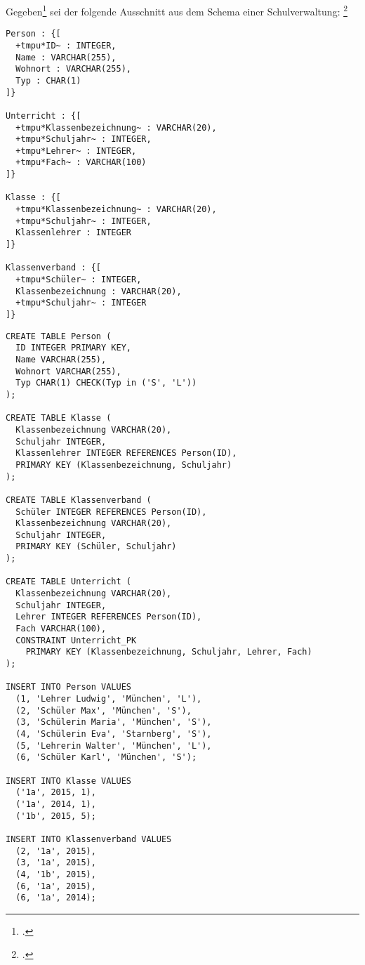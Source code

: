 \documentclass{bschlangaul-aufgabe}
\begin{document}

Gegeben\footcite{examen:66116:2016:09} sei der folgende Ausschnitt aus
dem Schema einer Schulverwaltung:
\footcite[2. SQL und relationale Algebra]{db:ab:examen-gym-2016-09}

\newcommand{\tmpu}[1]{\underline{\texttt{#1}}}

\begin{Verbatim}[commandchars=+*~]
Person : {[
  +tmpu*ID~ : INTEGER,
  Name : VARCHAR(255),
  Wohnort : VARCHAR(255),
  Typ : CHAR(1)
]}

Unterricht : {[
  +tmpu*Klassenbezeichnung~ : VARCHAR(20),
  +tmpu*Schuljahr~ : INTEGER,
  +tmpu*Lehrer~ : INTEGER,
  +tmpu*Fach~ : VARCHAR(100)
]}

Klasse : {[
  +tmpu*Klassenbezeichnung~ : VARCHAR(20),
  +tmpu*Schuljahr~ : INTEGER,
  Klassenlehrer : INTEGER
]}

Klassenverband : {[
  +tmpu*Schüler~ : INTEGER,
  Klassenbezeichnung : VARCHAR(20),
  +tmpu*Schuljahr~ : INTEGER
]}
\end{Verbatim}

\begin{verbatim}
CREATE TABLE Person (
  ID INTEGER PRIMARY KEY,
  Name VARCHAR(255),
  Wohnort VARCHAR(255),
  Typ CHAR(1) CHECK(Typ in ('S', 'L'))
);

CREATE TABLE Klasse (
  Klassenbezeichnung VARCHAR(20),
  Schuljahr INTEGER,
  Klassenlehrer INTEGER REFERENCES Person(ID),
  PRIMARY KEY (Klassenbezeichnung, Schuljahr)
);

CREATE TABLE Klassenverband (
  Schüler INTEGER REFERENCES Person(ID),
  Klassenbezeichnung VARCHAR(20),
  Schuljahr INTEGER,
  PRIMARY KEY (Schüler, Schuljahr)
);

CREATE TABLE Unterricht (
  Klassenbezeichnung VARCHAR(20),
  Schuljahr INTEGER,
  Lehrer INTEGER REFERENCES Person(ID),
  Fach VARCHAR(100),
  CONSTRAINT Unterricht_PK
    PRIMARY KEY (Klassenbezeichnung, Schuljahr, Lehrer, Fach)
);

INSERT INTO Person VALUES
  (1, 'Lehrer Ludwig', 'München', 'L'),
  (2, 'Schüler Max', 'München', 'S'),
  (3, 'Schülerin Maria', 'München', 'S'),
  (4, 'Schülerin Eva', 'Starnberg', 'S'),
  (5, 'Lehrerin Walter', 'München', 'L'),
  (6, 'Schüler Karl', 'München', 'S');

INSERT INTO Klasse VALUES
  ('1a', 2015, 1),
  ('1a', 2014, 1),
  ('1b', 2015, 5);

INSERT INTO Klassenverband VALUES
  (2, '1a', 2015),
  (3, '1a', 2015),
  (4, '1b', 2015),
  (6, '1a', 2015),
  (6, '1a', 2014);
\end{verbatim}
\end{document}
